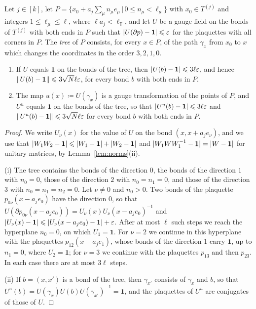 \documentclass[11pt]{preprint}
\newcommand{\id}{\mathbf 1}
\DeclarePairedDelimiter{\abs}{\lvert}{\rvert}
\DeclarePairedDelimiter{\norm}{\lVert}{\rVert}
\numberwithin{equation}{section}
\begin{document}
\begin{lemma}\label{lem:cube-gauge}
Let $j \in [k]$, let $P = \{ x_0 + a_j\sum_\mu n_\mu e_\mu \,|\, 0 \leqslant n_\mu < \ell_\mu \}$ with $x_0 \in T^{(j)}$ and integers $1 \leqslant \ell_\mu \leqslant \ell$, where $\ell a_j < \ell_{\mathbb T}$, and let $U$ be a gauge field on the bonds of $T^{(j)}$ with both ends in $P$ such that $\abs{U(\partial p) - \id} \leqslant \varepsilon$ for the plaquettes with all corners in $P$. The \emph{tree} of $P$ consists, for every $x \in P$, of the path $\gamma_x$ from $x_0$ to $x$ which changes the coordinates in the order $3, 2, 1, 0$.
\begin{enumerate}[label=(\roman*)]
\item If $U$ equals $\id$ on the bonds of the tree, then $\abs{U(b) - \id} \leqslant 3\ell\varepsilon$, and hence $\norm{U(b) - \id} \leqslant 3\sqrt N\ell\varepsilon$, for every bond $b$ with both ends in $P$.
\item The map $u(x) \coloneqq U(\gamma_x)$ is a gauge transformation of the points of $P$, and $U^u$ equals $\id$ on the bonds of the tree, so that $\abs{U^u(b) - \id} \leqslant 3\ell\varepsilon$ and $\norm{U^u(b) - \id} \leqslant 3\sqrt N\ell\varepsilon$ for every bond $b$ with both ends in $P$.
\end{enumerate}
\end{lemma}

\begin{proof}
We write $U_\nu(x)$ for the value of $U$ on the bond $(x, x + a_je_\nu)$, and we use that $\abs{W_1W_2 - \id} \leqslant \abs{W_1 - \id} + \abs{W_2 - \id}$ and $\abs{W_1WW_1^{-1} - \id} = \abs{W - \id}$ for unitary matrices, by Lemma~\ref{lem:norms}(ii).

(i) The tree contains the bonds of the direction $0$, the bonds of the direction $1$ with $n_0 = 0$, those of the direction $2$ with $n_0 = n_1 = 0$, and those of the direction $3$ with $n_0 = n_1 = n_2 = 0$. Let $\nu \neq 0$ and $n_0 > 0$. Two bonds of the plaquette $p_{0\nu}(x - a_je_0)$ have the direction $0$, so that $U(\partial p_{0\nu}(x - a_je_0)) = U_\nu(x)U_\nu(x - a_je_0)^{-1}$ and $\abs{U_\nu(x) - \id} \leqslant \abs{U_\nu(x - a_je_0) - \id} + \varepsilon$. After at most $\ell$ such steps we reach the hyperplane $n_0 = 0$, on which $U_1 = \id$. For $\nu = 2$ we continue in this hyperplane with the plaquettes $p_{12}(x - a_je_1)$, whose bonds of the direction $1$ carry $\id$, up to $n_1 = 0$, where $U_2 = \id$; for $\nu = 3$ we continue with the plaquettes $p_{13}$ and then $p_{23}$. In each case there are at most $3\ell$ steps.

(ii) If $b = (x, x')$ is a bond of the tree, then $\gamma_{x'}$ consists of $\gamma_x$ and $b$, so that $U^u(b) = U(\gamma_x)U(b)U(\gamma_{x'})^{-1} = \id$, and the plaquettes of $U^u$ are conjugates of those of $U$.
\end{proof}
\end{document}
